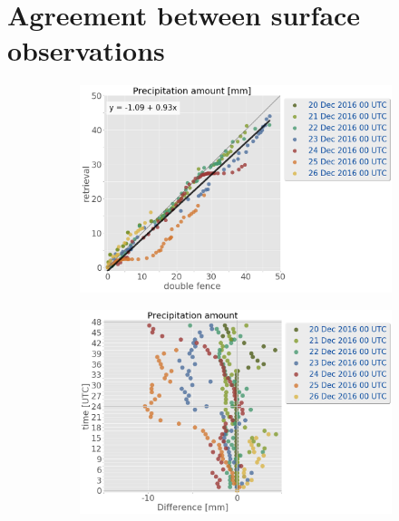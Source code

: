 
\section{Agreement between surface observations} 
\begin{figure}[t]
	\centering
    \begin{subfigure}[b]{0.38\textwidth}
    	\includegraphics[trim={0.cm 0.cm 13cm 0cm},clip,
    width=\textwidth]{./fig_obs_ret/obs_ret_20161220_26_00}
    \caption{}\label{fig:res:obs_ret_scatter}
    \end{subfigure}
    \begin{subfigure}[b]{0.59\textwidth}
    	\includegraphics[trim={0.cm 0.cm 0cm 0cm},clip,
    width=\textwidth]{./fig_obs_ret/diff_20161220_26_00}
    \caption{}\label{fig:res:diff_ret_scatter}
    \end{subfigure}
    

\end{figure}
